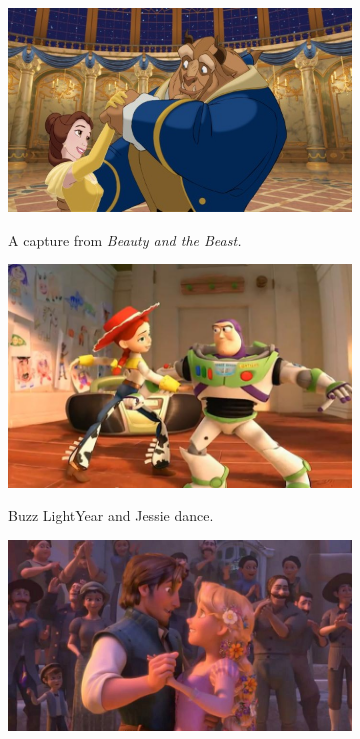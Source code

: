 \begin{figure}[h!]
	\centering
        \begin{subfigure}[b!]{0.3\textwidth}
        	\centering
                \includegraphics[width=\linewidth]{img/belleetlabete}
                \label{fig:belle}
                \caption{A capture from \textit{Beauty and the Beast.}}
        \end{subfigure}
        \quad
        \begin{subfigure}[b!]{0.3\textwidth}
        	\centering
                \includegraphics[width=\linewidth]{img/buzz-and-jessie}
                \label{fig:toystory}
                \caption{Buzz LightYear and Jessie dance.}
        \end{subfigure}%
        \quad
        \begin{subfigure}[b!]{0.3\textwidth}
        	\centering
                \includegraphics[width=\linewidth]{img/tangled}

\end{subfigure}
\end{figure}
